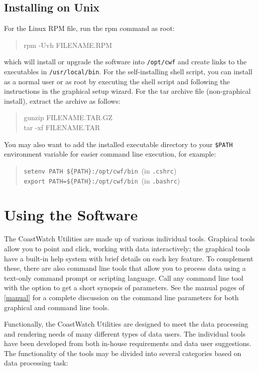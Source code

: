{\subsection{Installing on Unix}

For the Linux RPM file, run the rpm command as root:
\begin{quote}
  {\file rpm -Uvh} FILENAME.RPM
\end{quote}
which will install or upgrade the software into {\tt /opt/cwf} and create
links to the executables in {\tt /usr/local/bin}. For 
the self-installing shell script, you can
install as a normal user or as root by executing the shell script
and following the instructions in the graphical setup wizard.
For the tar archive file (non-graphical install),
extract the archive as follows:
\begin{quote}
  {\file gunzip} FILENAME.TAR.GZ \\
  {\file tar -xf} FILENAME.TAR
\end{quote}
You may also want to add the installed executable directory to
your {\tt \$PATH} environment variable for easier command line
execution, for example:
\begin{quote}
  {\tt setenv PATH \$\{PATH\}:/opt/cwf/bin}~(in {\tt .cshrc}) \\
  {\tt export PATH=\$\{PATH\}:/opt/cwf/bin}~(in {\tt .bashrc})
\end{quote}

\section{Using the Software}

The CoastWatch Utilities are made up of various individual tools.
Graphical tools allow you to point and click, working with data
interactively; the graphical tools have a built-in help system
with brief details on each key feature.  To complement these,
there are also command line tools that allow you to process data
using a text-only command prompt or scripting language.  Call any
command line tool with the  option to get a
short synopsis of parameters.  See the manual pages of
\autoref{manual} for a complete discussion on the command line
parameters for both graphical and command line tools.

Functionally, the CoastWatch Utilities are designed to meet the data
processing and rendering needs of many different types of data users.
The individual tools have been developed from both in-house
requirements and data user suggestions.  The functionality of the
tools may be divided into several categories based on data processing
task:
\begin{description}


\end{description}}

